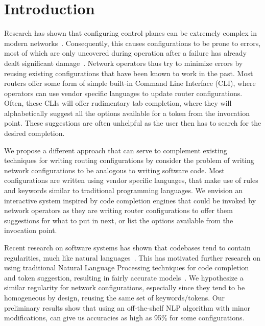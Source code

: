 \section{Introduction}

Research has shown that configuring control planes can be extremely complex in modern networks~\cite{complexity}. Consequently, this causes configurations to be prone to errors, most of which are only uncovered during operation after a failure has already dealt significant damage~\cite{errors}. Network operators thus try to minimize errors by reusing existing configurations that have been known to work in the past. Most routers offer some form of simple built-in Command Line Interface (CLI), where operators can use vendor specific languages to update router configurations. Often, these CLIs will offer rudimentary tab completion, where they will alphabetically suggest all the options available for a token from the invocation point. These suggestions are often unhelpful as the user then has to search for the desired completion.

We propose a different approach that can serve to complement existing techniques for writing routing configurations by consider the problem of writing network configurations to be analogous to writing software code. Most configurations are written using vendor specific languages, that make use of rules and keywords similar to traditional programming languages. We envision an interactive system inspired by code completion engines that could be invoked by network operators as they are writing router configurations to offer them suggestions for what to put in next, or list the options available from the invocation point.


Recent research on software systems has shown that codebases tend to contain regularities, much like natural languages~\cite{naturalness}. This has motivated further research on using traditional Natural Language Processing techniques for code completion and token suggestion, resulting in fairly accurate models~\cite{naturalness, raychev}. We hypothesize a similar regularity for network configurations, especially since they tend to be homogeneous by design, reusing the same set of keywords/tokens. Our preliminary results show that using an off-the-shelf NLP algorithm with minor modifications, can give us accuracies as high as 95\% for some configurations.
